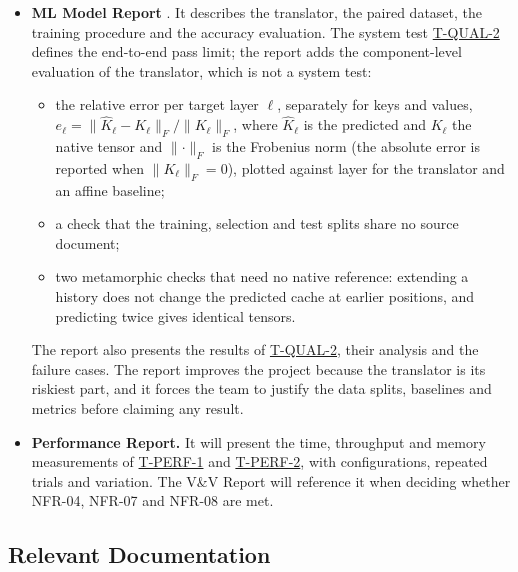 \documentclass[12pt, titlepage]{article}
\newcommand{\tref}[1]{\hyperref[test:#1]{#1}}
\begin{document}
\begin{itemize}
  \item \textbf{ML Model Report} \citep{TandemMLReport}. It describes the
  translator, the paired dataset, the training procedure and the accuracy
  evaluation. The system test \tref{T-QUAL-2} defines the end-to-end pass
  limit; the report adds the component-level evaluation of the translator,
  which is not a system test:
  \begin{itemize}
    \item the relative error per target layer $\ell$, separately for keys
    and values,
    $e_\ell = \lVert \hat{K}_\ell - K_\ell \rVert_F / \lVert K_\ell
    \rVert_F$, where $\hat{K}_\ell$ is the predicted and $K_\ell$ the native
    tensor and $\lVert\cdot\rVert_F$ is the Frobenius norm (the absolute
    error is reported when $\lVert K_\ell \rVert_F = 0$), plotted against
    layer for the translator and an affine baseline;
    \item a check that the training, selection and test splits share no
    source document;
    \item two metamorphic checks that need no native reference: extending a
    history does not change the predicted cache at earlier positions, and
    predicting twice gives identical tensors.
  \end{itemize}
  The report also presents the results of \tref{T-QUAL-2}, their analysis
  and the failure cases. The report improves the project because the translator is
  its riskiest part, and it forces the team to justify the data splits,
  baselines and metrics before claiming any result.
  \item \textbf{Performance Report.} It will present the time, throughput
  and memory measurements of \tref{T-PERF-1} and \tref{T-PERF-2}, with
  configurations, repeated trials and variation. The V\&V Report will
  reference it when deciding whether NFR-04, NFR-07 and NFR-08 are met.
\end{itemize}

\subsection{Relevant Documentation}
\end{document}
